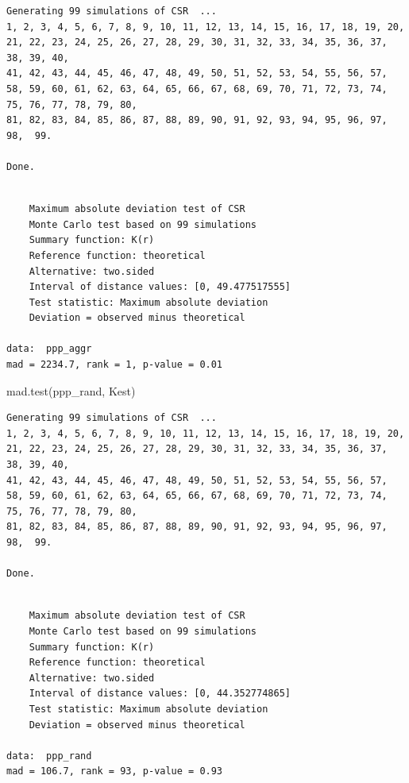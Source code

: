 \documentclass[
  letterpaper,
]{book}
\newenvironment{Shaded}{\begin{snugshade}}{\end{snugshade}}
\newcommand{\FunctionTok}[1]{\textcolor[rgb]{0.28,0.35,0.67}{#1}}
\newcommand{\NormalTok}[1]{\textcolor[rgb]{0.00,0.23,0.31}{#1}}
\begin{document}
\begin{verbatim}
Generating 99 simulations of CSR  ...
1, 2, 3, 4, 5, 6, 7, 8, 9, 10, 11, 12, 13, 14, 15, 16, 17, 18, 19, 20, 21, 22, 23, 24, 25, 26, 27, 28, 29, 30, 31, 32, 33, 34, 35, 36, 37, 38, 39, 40,
41, 42, 43, 44, 45, 46, 47, 48, 49, 50, 51, 52, 53, 54, 55, 56, 57, 58, 59, 60, 61, 62, 63, 64, 65, 66, 67, 68, 69, 70, 71, 72, 73, 74, 75, 76, 77, 78, 79, 80,
81, 82, 83, 84, 85, 86, 87, 88, 89, 90, 91, 92, 93, 94, 95, 96, 97, 98,  99.

Done.
\end{verbatim}

\begin{verbatim}

    Maximum absolute deviation test of CSR
    Monte Carlo test based on 99 simulations
    Summary function: K(r)
    Reference function: theoretical
    Alternative: two.sided
    Interval of distance values: [0, 49.477517555]
    Test statistic: Maximum absolute deviation
    Deviation = observed minus theoretical

data:  ppp_aggr
mad = 2234.7, rank = 1, p-value = 0.01
\end{verbatim}

\begin{Shaded}
\begin{Highlighting}[]
\FunctionTok{mad.test}\NormalTok{(ppp\_rand, Kest)}
\end{Highlighting}
\end{Shaded}

\begin{verbatim}
Generating 99 simulations of CSR  ...
1, 2, 3, 4, 5, 6, 7, 8, 9, 10, 11, 12, 13, 14, 15, 16, 17, 18, 19, 20, 21, 22, 23, 24, 25, 26, 27, 28, 29, 30, 31, 32, 33, 34, 35, 36, 37, 38, 39, 40,
41, 42, 43, 44, 45, 46, 47, 48, 49, 50, 51, 52, 53, 54, 55, 56, 57, 58, 59, 60, 61, 62, 63, 64, 65, 66, 67, 68, 69, 70, 71, 72, 73, 74, 75, 76, 77, 78, 79, 80,
81, 82, 83, 84, 85, 86, 87, 88, 89, 90, 91, 92, 93, 94, 95, 96, 97, 98,  99.

Done.
\end{verbatim}

\begin{verbatim}

    Maximum absolute deviation test of CSR
    Monte Carlo test based on 99 simulations
    Summary function: K(r)
    Reference function: theoretical
    Alternative: two.sided
    Interval of distance values: [0, 44.352774865]
    Test statistic: Maximum absolute deviation
    Deviation = observed minus theoretical

data:  ppp_rand
mad = 106.7, rank = 93, p-value = 0.93
\end{verbatim}
\end{document}
